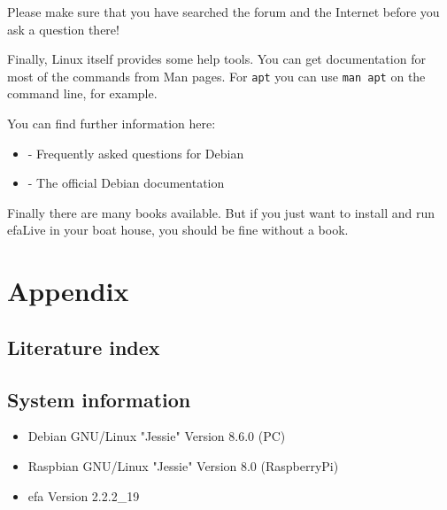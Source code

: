 \documentclass[a4paper,12pt,twoside]{article}
\begin{document}
Please make sure that
you have searched the forum and the Internet before you ask a question
there!

Finally, Linux itself provides some help tools. You can get
documentation for most of the commands from Man pages. For
\texttt{apt} you can use \texttt{man
apt} on the command line, for example.

You can find further information here:

\begin{itemize}
    \item \cite{HLP2} - Frequently asked questions for Debian
    \item \cite{HLP3} - The official Debian documentation
\end{itemize}

Finally there are many books available. But if you just want to install
and run efaLive in your boat house, you should be fine without a book.


\clearpage
\section{Appendix}
\label{sct:appendix}
\subsection{Literature index}
\label{sct:literature}




\subsection{System information}
\label{sct:sysinfo}

\begin{itemize}
    \item Debian GNU/Linux "Jessie" Version 8.6.0 (PC)
    \item Raspbian GNU/Linux "Jessie" Version 8.0 (RaspberryPi)
    \item efa Version 2.2.2\_19
\end{itemize}
\end{document}
